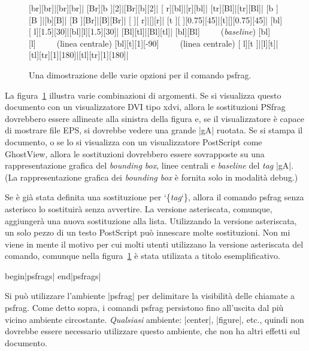 \documentclass[a4paper,11pt]{ltxguide}
\let\pkg\textsf
\newcommand{\pfg}{\pkg{PSfrag}}
\def\cs#1{%
  {\ttfamily\expandafter\string\csname #1\endcsname}}
\providecommand\marg[1]{%
  {\ttfamily\char`\{}{\em#1\/}{\ttfamily\char`\}}}
\begin{document}
\begin{figure}[tbh]
\psfragdebugon
\begin{center}
     [br][br]{|[br][br]|}
     [Br][b ][2]{|[Br][b][2]|}
     [ r][bl]{|[r][bl]|}
     [tr][Bl]{|[tr][Bl]|}
     [b ][B ]{|[b][B]|}
     [B ][Br]{|[B][Br]|}
     [  ][ r]{|[][r]|}
     [t ][  ][0.75][45]{|[t][][0.75][45]|}
     [bl][ l][1.5][30]{|[bl][l][1.5][30]|}
     [Bl][tl]{|[Bl][tl]|}
     [bl][Bl]{~~~~~(\emph{baseline})}
     [bl][l]{~~~~~(linea centrale)}
     [bl][t][1][-90]{~~~~~(linea centrale)}
     [ l][t ]{|[l][t]|}
     [tl][tr][1][180]{|[tl][tr][1][180]|}
\end{center}
\caption{Una dimostrazione delle varie opzioni per il comando \cs{psfrag}.}
\label{fig:argexam}
\end{figure}
La figura~\ref{fig:argexam} illustra varie combinazioni di argomenti.
Se si visualizza questo documento con un visualizzatore DVI tipo
\pkg{xdvi}, allora le sostituzioni \pfg{} dovrebbero essere allineate
alla sinistra della figura e, se il visualizzatore \`e capace di
mostrare file EPS, si dovrebbe vedere una grande |gA| ruotata.  Se si
stampa il documento, o se lo si visualizza con un visualizzatore
PostScript come GhostView, allora le sostituzioni dovrebbero essere
sovrapposte su una rappresentazione grafica del \emph{bounding box},
linee centrali e \emph{baseline} del \emph{tag} |gA|. (La
rappresentazione grafica dei \emph{bounding box} \`e fornita solo in
modalit\`a debug.)

Se \`e gi\`a stata definita una sostituzione per \marg{tag}, allora il
comando \cs{psfrag} senza asterisco lo sostituir\`a senza avvertire.
La versione asteriscata, comunque, aggiunger\`a una nuova
sostituzione alla lista. Utilizzando la versione asteriscata, un solo
pezzo di un testo PostScript pu\`o innescare molte sostituzioni. Non
mi viene in mente il motivo per cui molti utenti utilizzano la
versione asteriscata del comando, comunque nella
figura~\ref{fig:argexam} \`e stata utilizata a titolo esemplificativo.


\begin{decl}
\cs{begin}|{psfrags}|
\cs{end}|{psfrags}|
\end{decl}

Si pu\`o utilizzare l'ambiente |psfrag| per delimitare la visibilit\`a
delle chiamate a \cs{psfrag}.  Come detto sopra, i comandi \cs{psfrag}
persistono fino all'uscita dal pi\`u vicino ambiente circostante.
\emph{Qualsiasi} ambiente: |center|, |figure|, etc., quindi non
dovrebbe essere necessario utilizzare questo ambiente, che non ha
altri effetti sul documento.
\end{document}

